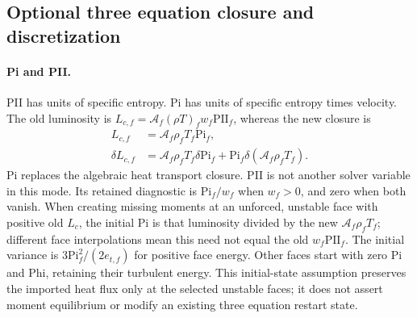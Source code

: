 \documentclass[11pt]{article}
\begin{document}
\subsection{Optional three equation closure and discretization}
\label{app:rsp2-moments}

\paragraph{Pi and PII.}
PII has units of specific entropy. Pi has units of specific entropy times
velocity. The old luminosity is
$L_{c,f}=\mathcal A_f(\rho T)_fw_f\mathrm{PII}_f$, whereas the new closure is
\begin{align}
 L_{c,f}&=\mathcal A_f\rho_fT_f\mathrm{Pi}_f,\\
 \delta L_{c,f}&=\mathcal A_f\rho_fT_f\delta\mathrm{Pi}_f
 +\mathrm{Pi}_f\delta(\mathcal A_f\rho_fT_f).
\end{align}
Pi replaces the algebraic heat transport closure. PII is not another solver
variable in this mode. Its retained diagnostic is $\mathrm{Pi}_f/w_f$ when
$w_f>0$, and zero when both vanish. When creating missing moments at an
unforced, unstable face with positive old $L_c$, the initial Pi is that
luminosity divided by the new $\mathcal A_f\rho_fT_f$; different face
interpolations mean this need not equal the old $w_f\mathrm{PII}_f$.
The initial variance is $3\mathrm{Pi}_f^2/(2e_{t,f})$ for positive face energy.
Other faces start with zero Pi and Phi, retaining their turbulent energy.
This initial-state assumption preserves the imported heat flux only at the
selected unstable faces; it does not assert moment equilibrium or modify
an existing three equation restart state.
\end{document}
